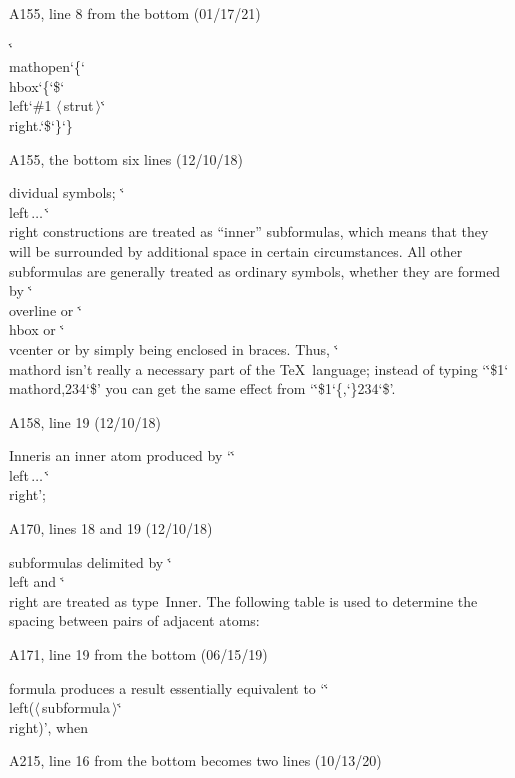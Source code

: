 \bugonpage A155, line 8 from the bottom (01/17/21)

\ninepoint\indent
\.{\char`\\mathopen\char`\{\char`\\hbox\char`\{\char`\$\char`\\left\char`\#1}%
$\langle\,$strut$\,\rangle$\.{\char`\\right.\char`\$\char`\}\char`\}}

\bugonpage A155, the bottom six lines (12/10/18)

\ninepoint\noindent
dividual symbols; \.{\char`\\left}$\,\ldots\,$\.{\char`\\right}
constructions are treated as ``inner'' subformulas, which means that
they will be surrounded by additional space in certain circumstances.
All other subformulas are generally treated as ordinary symbols,
whether they are formed by \.{\char`\\overline} or
\.{\char`\\hbox} or \.{\char`\\vcenter} or
by simply being enclosed in braces. Thus, \.{\char`\\mathord} isn't really
a necessary part of the \TeX\ language; instead of typing
`\.{\char`\$1\char`\\mathord,234\char`\$}' you can get the same
effect from `\.{\char`\$1\char`\{,\char`\}234\char`\$}'.

\bugonpage A158, line 19 (12/10/18)

\ninepoint\indent
Inner\quad is an inner atom produced by
 `\.{\char`\\left}$\,\ldots\,$\.{\char`\\right}';

\bugonpage A170, lines 18 and 19 (12/10/18)

\ninepoint\noindent
subformulas delimited by \.{\char`\\left} and \.{\char`\\right}
are treated as type~Inner. The following table is
used to determine the spacing between pairs of adjacent atoms:

\bugonpage A171, line 19 from the bottom (06/15/19)

\ninepoint\noindent
formula produces a result essentially equivalent to
`\.{\char`\\left(}$\langle\,$subformula$\,\rangle$\.{\char`\\right)}',
when\cutpar

\bugonpage A215, line 16 from the bottom becomes two lines (10/13/20)

